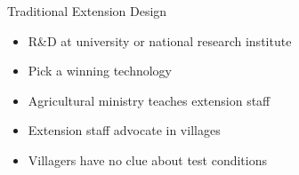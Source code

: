 \documentclass[
  ignorenonframetext,
]{beamer}
\providecommand{\tightlist}{%
  \setlength{\itemsep}{0pt}\setlength{\parskip}{0pt}}\usepackage{longtable,booktabs,array}
\begin{document}
\begin{frame}{Traditional Extension Design}
\protect\hypertarget{traditional-extension-design}{}
\begin{itemize}[<+->]
\tightlist
\item
  R\&D at university or national research institute
\item
  Pick a winning technology
\item
  Agricultural ministry teaches extension staff
\item
  Extension staff advocate in villages
\item
  Villagers have no clue about test conditions
\end{itemize}

\begin{figure}

\begin{minipage}[t]{0.20\linewidth}

{\centering 


}

\end{minipage}%
%
\begin{minipage}[t]{0.20\linewidth}

{\centering 

}
\end{minipage}
\end{figure}
\end{frame}
\end{document}
